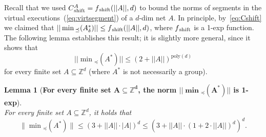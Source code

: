 \documentclass[11pt,a4paper]{amsart}
\newcommand{\sleq}{\preceq}
\newcommand{\minsleq}[1]{\min{}_\sleq(#1)}
\newcommand{\D}{{}_{\delta}}
\newcommand{\nnorm}[1]{||#1||}
\newcommand{\shift}{{}_\textnormal{shift}}
\newcommand{\Zset}{\mathbb{Z}}
\newcommand{\setZ}{\Zset}
\newcommand{\norm}[2]{\lVert #2 \rVert_{#1}}
\theoremstyle{plain}
\newtheorem{lem}[thm]{Lemma}
\theoremstyle{definition}
\theoremstyle{defC}
\theoremstyle{thmC}
\begin{document}
\noindent
Recall that we used
$C\shift^A=f\shift(\nnorm{A},d)$ to bound the norms of segments in the virtual
executions~(\ref{eq:virtsegment}) of a $d$-dim net $A$. In principle,
by~\eqref{eq:Cshift}
 we claimed  
that $\nnorm{\minsleq{A\D^*}}\leq f\shift(\nnorm{A},d)$, where
$f\shift$ is a 1-exp function. The following lemma establishes this
result; it is slightly more general, since it shows that 
	\[\nnorm{\minsleq{A^*}}\leq (2+\nnorm{A})^{\text{poly}(d)}\] 
for every finite set $A\subseteq \setZ^d$ (where $A^*$ is not necessarily a group).

\begin{lem}[\textbf{For every finite set $\bm{A\subseteq \setZ^d}$,	
the norm $\bm{\nnorm{\minsleq{A^*}}}$ is 1-exp}]\label{lem:Lminbound}
\hfill\\
For every finite set $A\subseteq \setZ^d$, it holds that
	\[\norm{}{\minsleq{A^*}}\leq  (3+\nnorm{A}\cdot |A|)^d\leq
	(3+\nnorm{A}\cdot (1+2\cdot\nnorm{A})^d)^d.\]
\end{lem}
\end{document}
